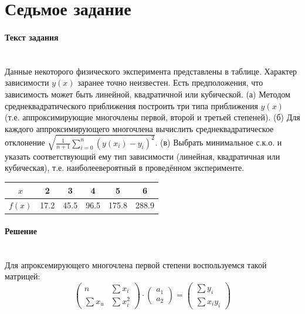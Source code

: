 \section{Седьмое задание}
\paragraph{Текст задания} ~\\
Данные некоторого физического эксперимента представлены в таблице. Характер зависимости $y(x)$ заранее точно неизвестен. Есть предположения, что зависимость может быть линейной, квадратичной или кубической. (а) Методом среднеквадратического приближения построить три типа приближения $y(x)$ (т.е. аппроксимирующие многочлены первой, второй и третьей степеней). (б) Для каждого аппроксимирующего многочлена вычислить среднеквадратическое отклонение $\sqrt{\frac{1}{n+1}\sum_{i=0}^{n}(y(x_{i}) - y_{i})^{2}}$. (в) Выбрать минимальное с.к.о. и указать соответствующий ему тип зависимости (линейная, квадратичная или кубическая), т.е. наиболеевероятный в проведённом эксперименте.

\begin{center}
  \begin{tabular}{ c | c | c | c | c | c }
    $x$ & 2 & 3 & 4 & 5 & 6 \\
    \hline
    $f(x)$ & 17.2 & 45.5 & 96.5 & 175.8 & 288.9
  \end{tabular}
\end{center}

\paragraph{Решение} ~\\
Для апроксемирующего многочлена первой степени воспользуемся такой матрицей:
\[
  \begin{pmatrix}
    n & \sum x_{i}\\
    \sum x_{u} & \sum x_{i}^{2}
  \end{pmatrix}
  \cdot
  \begin{pmatrix}
    a_{1} \\
    a_{2}
  \end{pmatrix}
  =
  \begin{pmatrix}
    \sum y_{i} \\
    \sum x_{i}y_{i}
  \end{pmatrix}
\]

